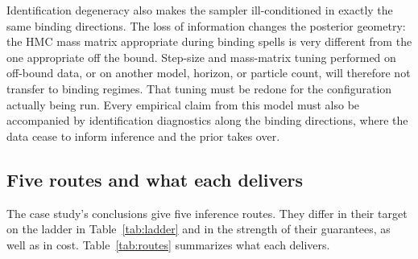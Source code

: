 \documentclass[11pt]{article}
\begin{document}
Identification degeneracy also makes the sampler ill-conditioned in exactly the same binding directions. The loss of information changes the posterior geometry: the HMC mass matrix appropriate during binding spells is very different from the one appropriate off the bound. Step-size and mass-matrix tuning performed on off-bound data, or on another model, horizon, or particle count, will therefore not transfer to binding regimes. That tuning must be redone for the configuration actually being run. Every empirical claim from this model must also be accompanied by identification diagnostics along the binding directions, where the data cease to inform inference and the prior takes over.

\subsection{Five routes and what each delivers}
\label{sec:shadow-routes}

The case study's conclusions give five inference routes. They differ in their target on the ladder in Table~\ref{tab:ladder} and in the strength of their guarantees, as well as in cost. Table~\ref{tab:routes} summarizes what each delivers.
\end{document}
